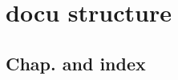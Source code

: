\documentclass{article}
\begin{document}

\section{docu structure}
\subsection{Chap. and index}
\end{document}
